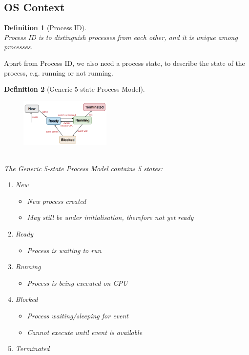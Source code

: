 \documentclass[12pt]{article}
\newtheorem{definition}{Definition}[section]
\theoremstyle{definition}
\begin{document}
\subsection{OS Context}
\begin{definition}[Process ID]
\hfill\\\normalfont Process ID is to distinguish processes from each other, and it is unique among processes.
\end{definition}
Apart from Process ID, we also need a process state, to describe the state of the process, e.g. running or not running.
\begin{definition}[Generic 5-state Process Model]
\begin{figure}[h]
\centering
\includegraphics[width=0.4\textwidth]{2_3.png}
\end{figure}
\hfill\\\normalfont The Generic 5-state Process Model contains 5 states:
\begin{enumerate}
  \item New
  \begin{itemize}
    \item New process created
    \item May still be under initialisation, therefore \textit{not yet} ready
  \end{itemize}
  \item Ready
  \begin{itemize}
    \item Process is waiting to run
  \end{itemize}
  \item Running
  \begin{itemize}
    \item Process is being executed on CPU
  \end{itemize}
  \item Blocked
  \begin{itemize}
    \item Process waiting/sleeping for event
    \item Cannot execute until event is available
  \end{itemize}
  \item Terminated
  \begin{itemize}

\end{itemize}
\end{enumerate}
\end{definition}
\end{document}
